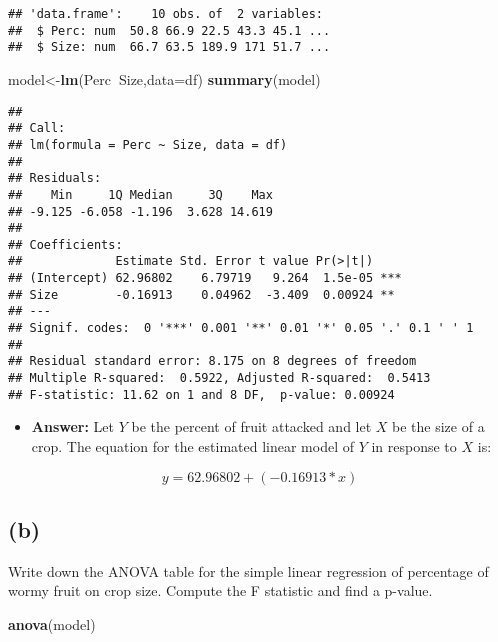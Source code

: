 \documentclass[]{article}
\newenvironment{Shaded}{\begin{snugshade}}{\end{snugshade}}
\newcommand{\KeywordTok}[1]{\textcolor[rgb]{0.13,0.29,0.53}{\textbf{#1}}}
\newcommand{\DataTypeTok}[1]{\textcolor[rgb]{0.13,0.29,0.53}{#1}}
\newcommand{\OperatorTok}[1]{\textcolor[rgb]{0.81,0.36,0.00}{\textbf{#1}}}
\newcommand{\NormalTok}[1]{#1}
\providecommand{\tightlist}{%
  \setlength{\itemsep}{0pt}\setlength{\parskip}{0pt}}
\begin{document}
\begin{verbatim}
## 'data.frame':    10 obs. of  2 variables:
##  $ Perc: num  50.8 66.9 22.5 43.3 45.1 ...
##  $ Size: num  66.7 63.5 189.9 171 51.7 ...
\end{verbatim}

\begin{Shaded}
\begin{Highlighting}[]
\NormalTok{model<-}\KeywordTok{lm}\NormalTok{(Perc}\OperatorTok{~}\NormalTok{Size,}\DataTypeTok{data=}\NormalTok{df)}
\KeywordTok{summary}\NormalTok{(model)}
\end{Highlighting}
\end{Shaded}

\begin{verbatim}
## 
## Call:
## lm(formula = Perc ~ Size, data = df)
## 
## Residuals:
##    Min     1Q Median     3Q    Max 
## -9.125 -6.058 -1.196  3.628 14.619 
## 
## Coefficients:
##             Estimate Std. Error t value Pr(>|t|)    
## (Intercept) 62.96802    6.79719   9.264  1.5e-05 ***
## Size        -0.16913    0.04962  -3.409  0.00924 ** 
## ---
## Signif. codes:  0 '***' 0.001 '**' 0.01 '*' 0.05 '.' 0.1 ' ' 1
## 
## Residual standard error: 8.175 on 8 degrees of freedom
## Multiple R-squared:  0.5922, Adjusted R-squared:  0.5413 
## F-statistic: 11.62 on 1 and 8 DF,  p-value: 0.00924
\end{verbatim}

\begin{itemize}
\tightlist
\item
  \textbf{Answer:} Let \(Y\) be the percent of fruit attacked and let
  \(X\) be the size of a crop. The equation for the estimated linear
  model of \(Y\) in response to \(X\) is:
\end{itemize}

\[
y = 62.96802 + (-0.16913 * x)
\]

\subsection{(b)}\label{b-2}

Write down the ANOVA table for the simple linear regression of
percentage of wormy fruit on crop size. Compute the F statistic and find
a p-value.

\begin{Shaded}
\begin{Highlighting}[]
\KeywordTok{anova}\NormalTok{(model)}
\end{Highlighting}
\end{Shaded}
\end{document}

